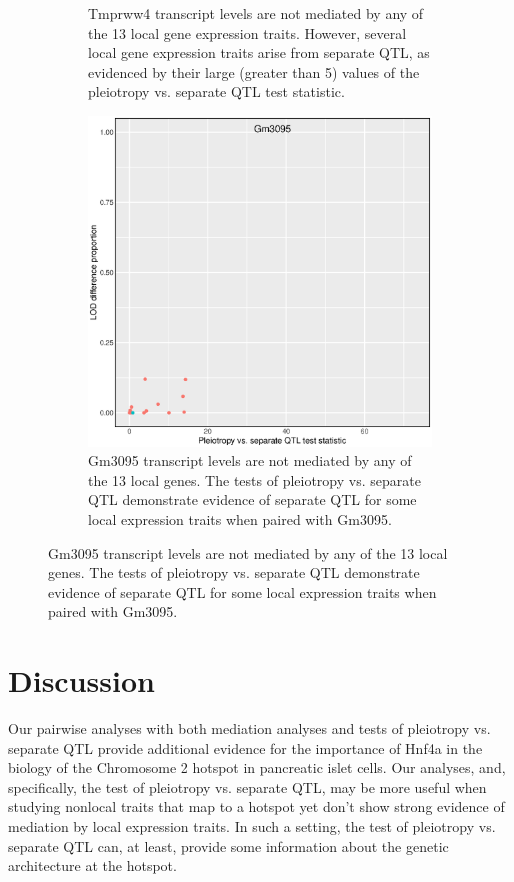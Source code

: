 \documentclass{article}
\begin{document}
\begin{figure}
\begin{subfigure}[t]{.45\textwidth}
        \caption{Tmprww4 transcript levels are not mediated by any of the 13 local gene expression traits. However, several local gene expression traits arise from separate QTL, as evidenced by their large (greater than 5) values of the pleiotropy vs. separate QTL test statistic.}
    \end{subfigure}
    \begin{subfigure}[t]{.45\textwidth}
        \includegraphics[width = \textwidth]{nonlocal-scatter_141.eps}
        \caption{Gm3095 transcript levels are not mediated by any of the 13 local genes. The tests of pleiotropy vs. separate QTL demonstrate evidence of separate QTL for some local expression traits when paired with Gm3095.}
    \end{subfigure}
    \label{fig:my_label}
\end{figure}





\section{Discussion}

Our pairwise analyses with both mediation analyses and tests of pleiotropy vs. separate QTL provide additional evidence for the importance of Hnf4a in the biology of the Chromosome 2 hotspot in pancreatic islet cells. Our analyses, and, specifically, the test of pleiotropy vs. separate QTL, may be more useful when studying nonlocal traits that map to a hotspot yet don't show strong evidence of mediation by local expression traits. In such a setting, the test of pleiotropy vs. separate QTL can, at least, provide some information about the genetic architecture at the hotspot. 
\end{document}
